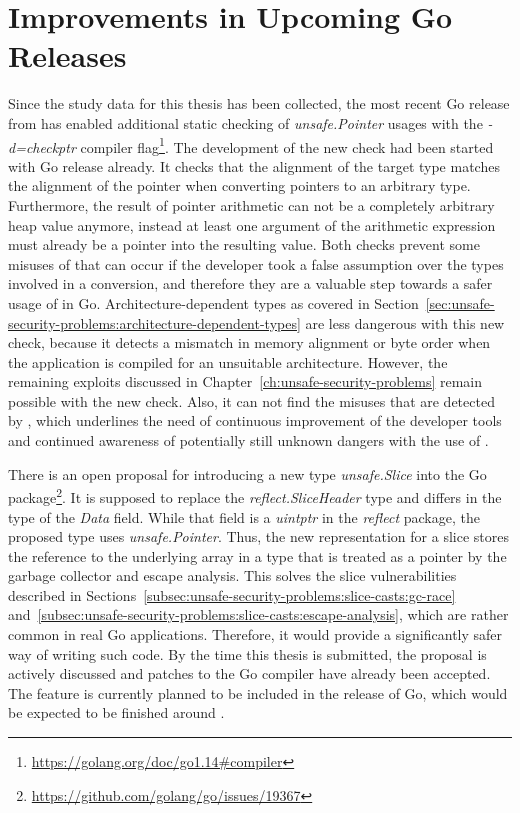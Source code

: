 
\section{Improvements in Upcoming Go Releases}\label{sec:discussion:changes-in-go}

Since the study data for this thesis has been collected, the most recent Go release  from
 has enabled additional static checking of \textit{unsafe.Pointer} usages with the
\textit{-d=checkptr} compiler flag\footnote{\url{https://golang.org/doc/go1.14\#compiler}}.
The development of the new check had been started with Go release  already.
It checks that the alignment of the target type matches the alignment of the pointer when converting \unsafe{} pointers
to an arbitrary type.
Furthermore, the result of pointer arithmetic can not be a completely arbitrary heap value anymore, instead at least one
argument of the arithmetic expression must already be a pointer into the resulting value.
Both checks prevent some misuses of \unsafe{} that can occur if the developer took a false assumption over the types
involved in a conversion, and therefore they are a valuable step towards a safer usage of \unsafe{} in Go.
Architecture-dependent types as covered in Section~\ref{sec:unsafe-security-problems:architecture-dependent-types} are
less dangerous with this new check, because it detects a mismatch in memory alignment or byte order when the application
is compiled for an unsuitable architecture.
However, the remaining exploits discussed in Chapter~\ref{ch:unsafe-security-problems} remain possible with the new
check.
Also, it can not find the misuses that are detected by \toolSafer{}, which underlines the need of continuous improvement
of the developer tools and continued awareness of potentially still unknown dangers with the use of \unsafe{}.

There is an open proposal for introducing a new type \textit{unsafe.Slice} into the Go \unsafe{}
package\footnote{\url{https://github.com/golang/go/issues/19367}}.
It is supposed to replace the \textit{reflect.SliceHeader} type and differs in the type of the \textit{Data} field.
While that field is a \textit{uintptr} in the \textit{reflect} package, the proposed type uses \textit{unsafe.Pointer}.
Thus, the new representation for a slice stores the reference to the underlying array in a type that is treated as a
pointer by the garbage collector and escape analysis.
This solves the slice vulnerabilities described in Sections~\ref{subsec:unsafe-security-problems:slice-casts:gc-race}
and~\ref{subsec:unsafe-security-problems:slice-casts:escape-analysis}, which are rather common in real Go applications.
Therefore, it would provide a significantly safer way of writing such code.
By the time this thesis is submitted, the proposal is actively discussed and patches to the Go compiler have already
been accepted.
The feature is currently planned to be included in the  release of Go, which would be expected to be
finished around .

